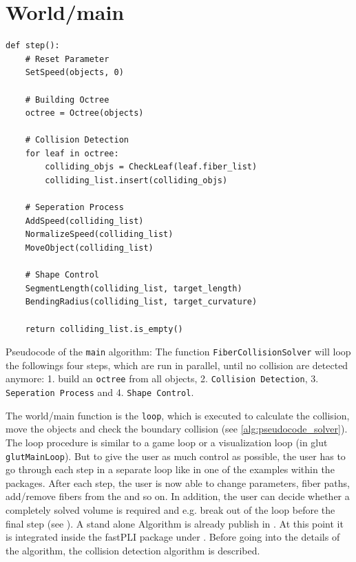 \section{World/main}
% 
\begin{lstfloat}[!tb]
\lstset{style=python}
\begin{lstlisting}[]
def step():
    # Reset Parameter
    SetSpeed(objects, 0)
    
    # Building Octree
    octree = Octree(objects)
    
    # Collision Detection
    for leaf in octree:
        colliding_objs = CheckLeaf(leaf.fiber_list)
        colliding_list.insert(colliding_objs)
	
    # Seperation Process
    AddSpeed(colliding_list)
    NormalizeSpeed(colliding_list)
    MoveObject(colliding_list)
	
    # Shape Control
    SegmentLength(colliding_list, target_length)
    BendingRadius(colliding_list, target_curvature)

    return colliding_list.is_empty()
\end{lstlisting}
\caption{Pseudocode of the \texttt{main} algorithm: The function \texttt{FiberCollisionSolver} will loop the followings four steps, which are run in parallel, until no collision are detected anymore: 1. build an \texttt{octree} from all objects, 2. \texttt{Collision Detection}, 3. \texttt{Seperation Process} and 4. \texttt{Shape Control}. }
\label{alg:pseudocode_solver}
\end{lstfloat}
% 
The world/main function is the \texttt{loop}, which is executed to calculate the collision, move the objects and check the boundary collision (see \cref{alg:pseudocode_solver}).
The loop procedure is similar to a game loop or a visualization loop (\eg in glut \texttt{glutMainLoop}).
But to give the user as much control as possible, the user has to go through each step in a separate loop like in one of the examples within the packages.
After each step, the user is now able to change parameters, fiber paths, add/remove fibers from the  and so on.
In addition, the user can decide whether a completely solved volume is required and e.g. break out of the loop before the final step (see \dummy{}).
%
A stand alone Algorithm is already publish in \cite{matuschke2019}.
At this point it is integrated inside the \ac{fastPLI} package under .
Before going into the details of the algorithm, the collision detection algorithm is described.
% 
% 
% 
